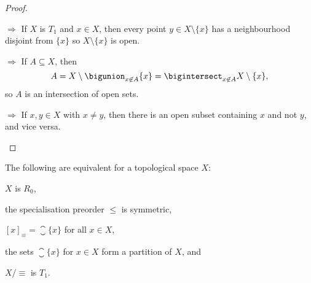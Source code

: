 \documentclass[article, a4paper, 11pt, oneside]{memoir}
\numberwithin{equation}{chapter}
\renewcommand{\implies}{\Rightarrow}
\begin{document}
\begin{proof}
\begin{proofsec}
    \item[\subcref{enum:T1-space} $\implies$ \subcref{enum:T1-singletons-closed}]
    If $X$ is $T_1$ and $x \in X$, then every point $y \in X \setminus \{x\}$ has a neighbourhood disjoint from $\{x\}$ so $X \setminus \{x\}$ is open.

    \item[\subcref{enum:T1-singletons-closed} $\implies$ \subcref{enum:T1-intersection-of-open-sets}]
    If $A \subseteq X$, then
    \begin{equation*}
        A   = X \setminus \bigunion_{x \not\in A} \{x\}
            = \bigintersect_{x \not\in A} X \setminus \{x\},
    \end{equation*}
    so $A$ is an intersection of open sets.

    \item[\subcref{enum:T1-intersection-of-open-sets} $\implies$ \subcref{enum:T1-space}]
    If $x,y \in X$ with $x \neq y$, then there is an open subset containing $x$ and not $y$, and vice versa.
\end{proofsec}
\end{proof}



\begin{proposition}
    The following are equivalent for a topological space $X$:
    \begin{enumprop}
        \item \label{enum:R0-space} $X$ is $R_0$,
        \item \label{enum:R0-specialisation-preorder-symmetric} the specialisation preorder $\leq$ is symmetric,
        \item \label{enum:R0-closure-of-point} $[x]_\equiv = \closure{\{x\}}$ for all $x \in X$,
        \item \label{enum:R0-partition} the sets $\closure{\{x\}}$ for $x \in X$ form a partition of $X$, and
        \item \label{enum:R0-quotient-is-T1} $X/{\equiv}$ is $T_1$.
    \end{enumprop}
\end{proposition}
\end{document}

